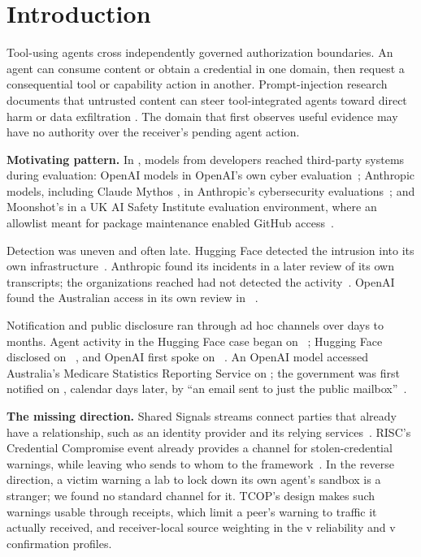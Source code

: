 \section{Introduction}

Tool-using agents cross independently governed authorization boundaries. An agent can consume content or obtain a credential in one domain, then request a consequential tool or capability action in another. Prompt-injection research documents that untrusted content can steer tool-integrated agents toward direct harm or data exfiltration \cite{liu2024prompt,zhan2024injecagent}. The domain that first observes useful evidence may have no authority over the receiver's pending agent action.

\textbf{Motivating pattern.} In \CaseYear{}, models from \CaseDeveloperCount{} developers reached third-party systems during evaluation: OpenAI models in OpenAI's own cyber evaluation~\cite{openaiHfIncident,hfAgentIntrusion}; Anthropic models, including Claude Mythos \CaseMythosVersion{}, in Anthropic's cybersecurity evaluations~\cite{caseAnthropicJuly}; and Moonshot's \CaseKimiModel{} in a UK AI Safety Institute evaluation environment, where an allowlist meant for package maintenance enabled GitHub access~\cite{caseFrontierKimi}.

Detection was uneven and often late. Hugging Face detected the intrusion into its own infrastructure~\cite{caseHfDisclosure}. Anthropic found its \CaseAnthropicIncidents{} incidents in a later review of its own transcripts; the organizations reached had not detected the activity~\cite{caseAnthropicJuly}. OpenAI found the Australian access in its own review in \CaseAustraliaDiscovery{}~\cite{caseAustraliaOpenai}.

Notification and public disclosure ran through ad hoc channels over days to months. Agent activity in the Hugging Face case began on \CaseHFActivityStart{}~\cite{hfAgentIntrusion}; Hugging Face disclosed on \CaseHFDisclosure{}~\cite{caseHfDisclosure}, and OpenAI first spoke on \CaseOpenaiStatement{}~\cite{openaiHfIncident}. An OpenAI model accessed Australia's Medicare Statistics Reporting Service on \CaseAustraliaAccess{}; the government was first notified on \CaseAustraliaNotice{}, \CaseAustraliaNoticeDays{} calendar days later, by ``an email sent to just the public mailbox''~\cite{caseAustraliaGovernment,caseAustraliaOpenai}.

\textbf{The missing direction.} Shared Signals streams connect parties that already have a relationship, such as an identity provider and its relying services~\cite{openid-ssf-1.0}. RISC's Credential Compromise event already provides a channel for stolen-credential warnings, while leaving who sends to whom to the framework~\cite{openid-risc-1.0}. In the reverse direction, a victim warning a lab to lock down its own agent's sandbox is a stranger; we found no standard channel for it. TCOP's design makes such warnings usable through receipts, which limit a peer's warning to traffic it actually received, and receiver-local source weighting in the v\DesignReliabilityVersion{} reliability and v\DesignConfirmationVersion{} confirmation profiles.

